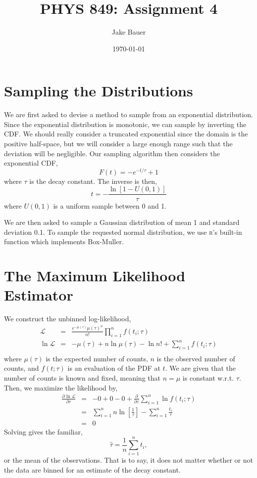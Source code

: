 \documentclass[12pt]{article}
\newcommand{\deriv}[3][]{%
  \ensuremath{\frac{\partial^{#1} {#2}}{\partial {#3}^{#1}}}}
\begin{document}
\title{PHYS 849: Assignment 4}
\author{Jake Bauer}
\date{\today}
\maketitle

\section{Sampling the Distributions}
We are first asked to devise a method to sample from an exponential distribution. Since the exponential distribution is monotonic, we can sample by inverting the CDF.  We should really consider a truncated exponential since the domain is the positive half-space, but we will consider a large enough range such that the deviation will be negligible.  Our sampling algorithm then considers the exponential CDF,
\begin{equation}
F(t) = - e^{-t / \tau} + 1
\end{equation}
where  $\tau$ is the decay constant.  The inverse is then,
\begin{equation}
t = -\frac{\ln [1 - U(0,1)] }{\tau}
\end{equation}
where $U(0,1)$ is a uniform sample between 0 and 1. 

We are then asked to sample a Gaussian distribution of mean 1 and standard deviation 0.1.  To sample the requested normal distribution, we use \textsc{r}'s built-in function which implements Box-Muller.  

\section{The Maximum Likelihood Estimator}
We construct the unbinned log-likelihood,
\begin{eqnarray}
\mathcal{L} &=& \frac{e^{-\mu(\tau) }\mu(\tau)^{n}}{n!} \prod_{i=1}^n f(t_i; \tau)\\
\ln \mathcal{L} &=& - \mu(\tau) + n \ln \mu(\tau) - \ln n! + \sum_{i=1}^n f(t_i; \tau)\\
\end{eqnarray}
where $\mu(\tau)$ is the expected number of counts, $n$ is the observed number of counts, and $f(t; \tau)$ is an evaluation of the PDF at $t$.  We are given that the number of counts is known and fixed, meaning that $n=\mu$ is constant w.r.t. $\tau$.  Then, we maximize the likelihood by,
\begin{eqnarray}
\deriv{\ln \mathcal{L}}{\tau} &=& -0 + 0 - 0 + \deriv{}{\tau} \sum_{i = 1}^n \ln f(t_i; \tau)\\
&=& \sum_{i=1}^n n \ln \left[\frac{1}{\tau}\right] - \sum_{i=1}^n \frac{t_i}{\tau}\\
&=& 0
\end{eqnarray}
Solving gives the familiar,
\begin{equation}
\hat{\tau} = \frac{1}{n} \sum_{i=1}^{n} t_i,
\end{equation}
or the mean of the observations.  That is to say, it does not matter whether or not the data are binned for an estimate of the decay constant.
\end{document}
